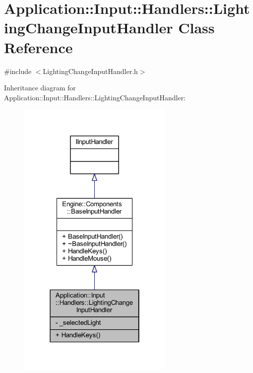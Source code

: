 \hypertarget{classApplication_1_1Input_1_1Handlers_1_1LightingChangeInputHandler}{}\section{Application\+:\+:Input\+:\+:Handlers\+:\+:Lighting\+Change\+Input\+Handler Class Reference}
\label{classApplication_1_1Input_1_1Handlers_1_1LightingChangeInputHandler}


{\ttfamily \#include $<$Lighting\+Change\+Input\+Handler.\+h$>$}



Inheritance diagram for Application\+:\+:Input\+:\+:Handlers\+:\+:Lighting\+Change\+Input\+Handler\+:
\nopagebreak
\begin{figure}[H]
\begin{center}
\leavevmode
\includegraphics[width=214pt]{classApplication_1_1Input_1_1Handlers_1_1LightingChangeInputHandler__inherit__graph}
\end{center}
\end{figure}



